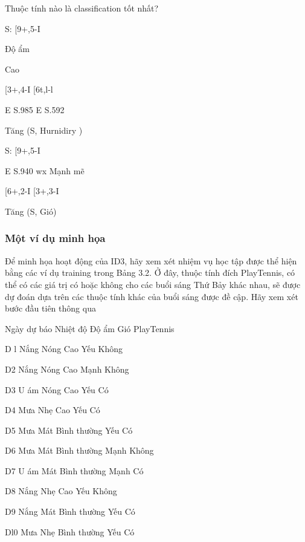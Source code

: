 Thuộc tính nào là classification tốt nhất?

S: [9+,5-I

Độ ẩm

Cao

[3+,4-I [6t,l-l

E S.985 E S.592

Tăng (S, Hurnidiry )

S: [9+,5-I

E S.940 wx Mạnh mẽ

[6+,2-I [3+,3-I

Tăng (S, Gió)

\subsubsection{Một ví dụ minh họa}

Để minh họa hoạt động của ID3, hãy xem xét nhiệm vụ học tập được thể hiện bằng các ví dụ training trong Bảng 3.2. Ở đây, thuộc tính đích PlayTennis, có thể có các giá trị có hoặc không cho các buổi sáng Thứ Bảy khác nhau, sẽ được dự đoán dựa trên các thuộc tính khác của buổi sáng được đề cập. Hãy xem xét bước đầu tiên thông qua

Ngày dự báo Nhiệt độ Độ ẩm Gió PlayTennis

D l Nắng Nóng Cao Yếu Không

D2 Nắng Nóng Cao Mạnh Không

D3 U ám Nóng Cao Yếu Có

D4 Mưa Nhẹ Cao Yếu Có

D5 Mưa Mát Bình thường Yếu Có

D6 Mưa Mát Bình thường Mạnh Không

D7 U ám Mát Bình thường Mạnh Có

D8 Nắng Nhẹ Cao Yếu Không

D9 Nắng Mát Bình thường Yếu Có

Dl0 Mưa Nhẹ Bình thường Yếu Có

